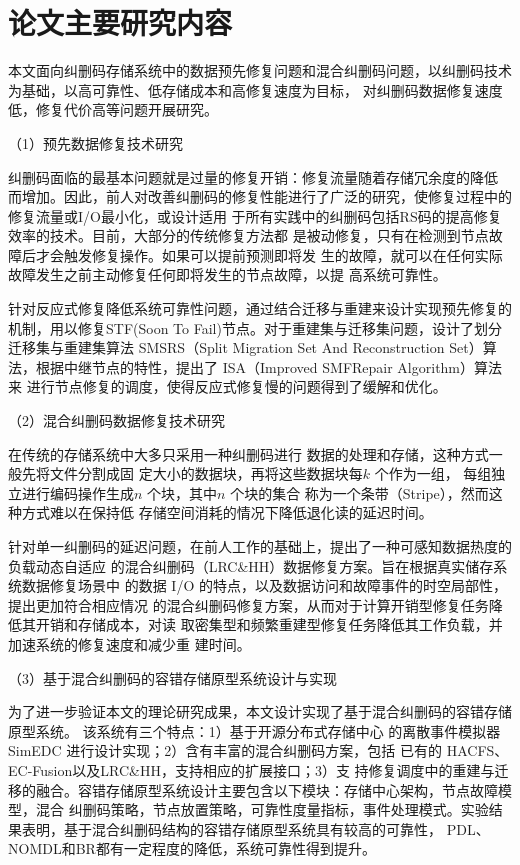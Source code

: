 
\section{论文主要研究内容}
本文面向纠删码存储系统中的数据预先修复问题和混合纠删码问题，以纠删码技术为基础，以高可靠性、低存储成本和高修复速度为目标，
对纠删码数据修复速度低，修复代价高等问题开展研究。

（1）预先数据修复技术研究

纠删码面临的最基本问题就是过量的修复开销：修复流量随着存储冗余度的降低
而增加。因此，前人对改善纠删码的修复性能进行了广泛的研究，使修复过程中的
修复流量或I/O最小化，或设计适用
于所有实践中的纠删码包括RS码的提高修复效率的技术。目前，大部分的传统修复方法都
是被动修复，只有在检测到节点故障后才会触发修复操作。如果可以提前预测即将发
生的故障，就可以在任何实际故障发生之前主动修复任何即将发生的节点故障，以提
高系统可靠性。

针对反应式修复降低系统可靠性问题，通过结合迁移与重建来设计实现预先修复的机制，用以修复STF(Soon To
Fail)节点。对于重建集与迁移集问题，设计了划分迁移集与重建集算法
SMSRS（Split Migration Set And Reconstruction Set）算法，根据中继节点的特性，提出了 ISA（Improved SMFRepair Algorithm）算法来
进行节点修复的调度，使得反应式修复慢的问题得到了缓解和优化。

（2）混合纠删码数据修复技术研究

在传统的存储系统中大多只采用一种纠删码进行
数据的处理和存储，这种方式一般先将文件分割成固
定大小的数据块，再将这些数据块每$k$
个作为一组，
每组独立进行编码操作生成$n$
个块，其中$n$
个块的集合
称为一个条带（Stripe），然而这种方式难以在保持低
存储空间消耗的情况下降低退化读的延迟时间。

针对单一纠删码的延迟问题，在前人工作的基础上，提出了一种可感知数据热度的负载动态自适应
的混合纠删码（LRC\&HH）数据修复方案。旨在根据真实储存系统数据修复场景中
的数据 I/O 的特点，以及数据访问和故障事件的时空局部性，提出更加符合相应情况
的混合纠删码修复方案，从而对于计算开销型修复任务降低其开销和存储成本，对读
取密集型和频繁重建型修复任务降低其工作负载，并加速系统的修复速度和减少重
建时间。


（3）基于混合纠删码的容错存储原型系统设计与实现

为了进一步验证本文的理论研究成果，本文设计实现了基于混合纠删码的容错存储原型系统。
该系统有三个特点：1）基于开源分布式存储中心
的离散事件模拟器 SimEDC 进行设计实现；2）含有丰富的混合纠删码方案，包括
已有的 HACFS、EC-Fusion以及LRC\&HH，支持相应的扩展接口；3）支
持修复调度中的重建与迁移的融合。容错存储原型系统设计主要包含以下模块：存储中心架构，节点故障模型，混合
纠删码策略，节点放置策略，可靠性度量指标，事件处理模式。实验结果表明，基于混合纠删码结构的容错存储原型系统具有较高的可靠性，
PDL、NOMDL和BR都有一定程度的降低，系统可靠性得到提升。


